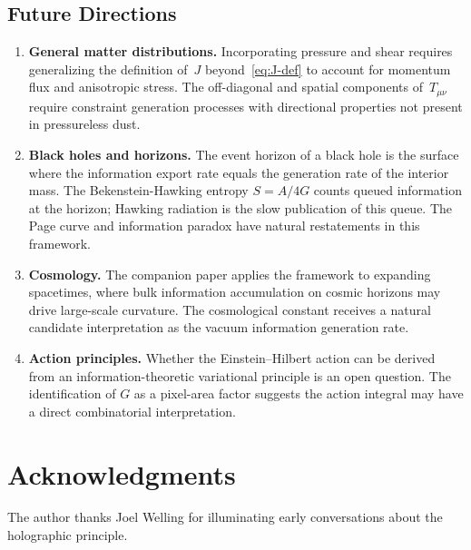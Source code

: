\documentclass[12pt]{article}
\begin{document}
\subsection{Future Directions}

\begin{enumerate}
  \item \textbf{General matter distributions.}
        Incorporating pressure and shear requires generalizing
        the definition of~$J$ beyond~\eqref{eq:J-def} to account
        for momentum flux and anisotropic stress.
        The off-diagonal and spatial components of~$T_{\mu\nu}$
        require constraint generation processes with directional
        properties not present in pressureless dust.

  \item \textbf{Black holes and horizons.}
        The event horizon of a black hole is the surface where
        the information export rate equals the generation rate
        of the interior mass.
        The Bekenstein-Hawking entropy $S=A/4G$ counts queued
        information at the horizon; Hawking radiation is the
        slow publication of this queue.
        The Page curve and information paradox have natural
        restatements in this framework.

  \item \textbf{Cosmology.}
        The companion paper applies the framework to expanding
        spacetimes, where bulk information accumulation on
        cosmic horizons may drive large-scale curvature.
        The cosmological constant receives a natural candidate
        interpretation as the vacuum information generation rate.

  \item \textbf{Action principles.}
        Whether the Einstein--Hilbert action can be derived
        from an information-theoretic variational principle
        is an open question.
        The identification of $G$ as a pixel-area factor
        suggests the action integral may have a direct
        combinatorial interpretation.
\end{enumerate}

\section*{Acknowledgments}

The author thanks Joel Welling for illuminating early
conversations about the holographic principle.
\end{document}
